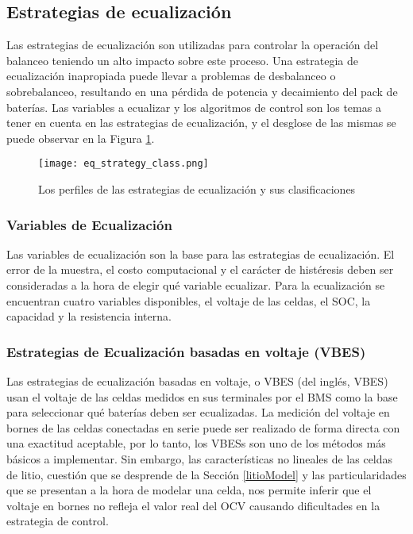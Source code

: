 \subsection{Estrategias de ecualizaci\'on}

Las estrategias de ecualizaci\'on son utilizadas para controlar la operaci\'on
del balanceo teniendo un alto impacto sobre este proceso. Una estrategia de 
ecualizaci\'on inapropiada puede llevar a problemas de desbalanceo o 
sobrebalanceo, resultando en una p\'erdida de potencia y decaimiento del pack de 
bater\'ias. Las variables a ecualizar y los algoritmos de control son los temas 
a tener en cuenta en las estrategias de ecualizaci\'on, y el desglose de las 
mismas se puede observar en la Figura \ref{eq_strategy_class}.

\begin{figure}[h!]
    \begin{center}
        \texttt{[image: eq\_strategy\_class.png]}
        \caption{Los perfiles de las estrategias de ecualizaci\'on y sus
                 clasificaciones}
        \label{eq_strategy_class}
    \end{center}
\end{figure}

\subsubsection{Variables de Ecualizaci\'on}

Las variables de ecualizaci\'on son la base para las estrategias de
ecualizaci\'on. El error de la muestra, el costo computacional y el car\'acter de
hist\'eresis deben ser consideradas a la hora de elegir qué variable ecualizar.
Para la ecualizaci\'on se encuentran cuatro variables disponibles, el voltaje de 
las celdas, el \acrshort{SOC}, la capacidad y la resistencia interna.

\subsubsection{Estrategias de Ecualizaci\'on basadas en voltaje
(\acrshort{VBES})}

Las estrategias de ecualizaci\'on basadas en voltaje, o \acrshort{VBES} 
(del ingl\'es, \acrlong{VBES}) usan el voltaje de las celdas medidos en sus 
terminales por el \acrshort{BMS} como la base para seleccionar qué bater\'ias 
deben ser ecualizadas. La medición del voltaje en bornes de las celdas 
conectadas en serie puede ser realizado de forma directa con una exactitud 
aceptable, por lo tanto, los \acrshort{VBES}s son uno de los m\'etodos
m\'as b\'asicos a implementar. Sin embargo, las características no
lineales de las celdas de litio, cuestión que se desprende de la Sección
\ref{litioModel} y las particularidades que se presentan a la hora de modelar
una celda, nos permite inferir que el voltaje en bornes no refleja el valor real
del \acrshort{OCV} causando dificultades en la estrategia de control.

